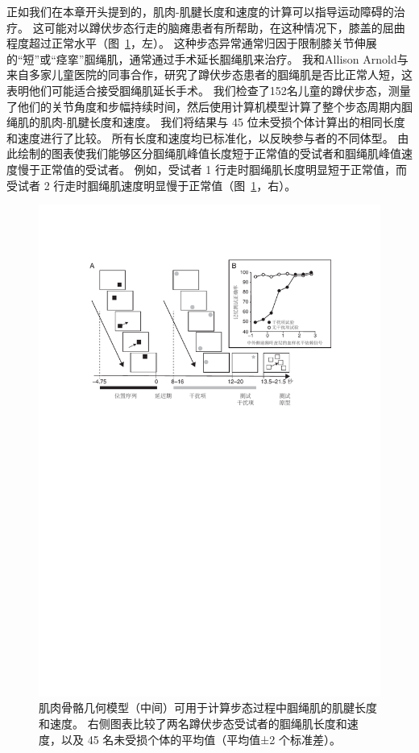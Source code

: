 正如我们在本章开头提到的，肌肉-肌腱长度和速度的计算可以指导运动障碍的治疗。
这可能对以蹲伏步态行走的脑瘫患者有所帮助，在这种情况下，膝盖的屈曲程度超过正常水平（图~\ref{fig:6_10}，左）。
这种步态异常通常归因于限制膝关节伸展的“短”或“痉挛”腘绳肌，通常通过手术延长腘绳肌来治疗。
我和Allison Arnold与来自多家儿童医院的同事合作，研究了蹲伏步态患者的腘绳肌是否比正常人短，这表明他们可能适合接受腘绳肌延长手术。
我们检查了152名儿童的蹲伏步态，测量了他们的关节角度和步幅持续时间，然后使用计算机模型计算了整个步态周期内腘绳肌的肌肉-肌腱长度和速度。
我们将结果与 45 位未受损个体计算出的相同长度和速度进行了比较。
所有长度和速度均已标准化，以反映参与者的不同体型。
由此绘制的图表使我们能够区分腘绳肌峰值长度短于正常值的受试者和腘绳肌峰值速度慢于正常值的受试者。
例如，受试者 1 行走时腘绳肌长度明显短于正常值，而受试者 2 行走时腘绳肌速度明显慢于正常值（图~\ref{fig:6_10}，右）。


\begin{figure}[!htb]
	\centering
	\includegraphics[width=1.0\linewidth]{chap6/6_10}
	\caption{肌肉骨骼几何模型（中间）可用于计算步态过程中腘绳肌的肌腱长度和速度。
		右侧图表比较了两名蹲伏步态受试者的腘绳肌长度和速度，以及 45 名未受损个体的平均值（平均值±2 个标准差）\cite{arnold2006role}。 \label{fig:6_10}}
\end{figure}


